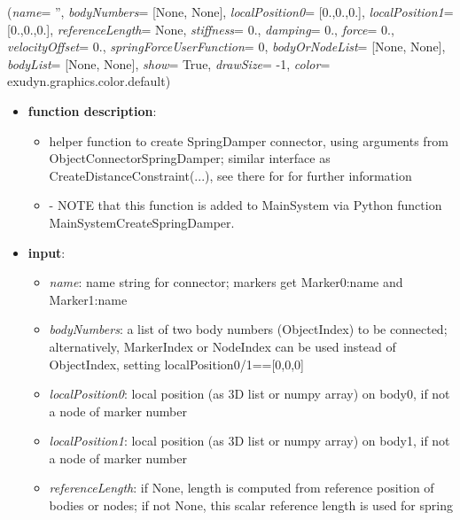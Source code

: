 %
\begin{flushleft}
\label{sec:mainsystemextensions:CreateSpringDamper}
({\it name}= '', {\it bodyNumbers}= [None, None], {\it localPosition0}= [0.,0.,0.], {\it localPosition1}= [0.,0.,0.], {\it referenceLength}= None, {\it stiffness}= 0., {\it damping}= 0., {\it force}= 0., {\it velocityOffset}= 0., {\it springForceUserFunction}= 0, {\it bodyOrNodeList}= [None, None], {\it bodyList}= [None, None], {\it show}= True, {\it drawSize}= -1, {\it color}= exudyn.graphics.color.default)
\end{flushleft}
\setlength{\itemindent}{0.7cm}
\begin{itemize}[leftmargin=0.7cm]
\item[--]
{\bf function description}: \vspace{-6pt}
\begin{itemize}[leftmargin=1.2cm]
\setlength{\itemindent}{-0.7cm}
\item[]helper function to create SpringDamper connector, using arguments from ObjectConnectorSpringDamper; similar interface as CreateDistanceConstraint(...), see there for for further information
\item[]- NOTE that this function is added to MainSystem via Python function MainSystemCreateSpringDamper.
\end{itemize}
\item[--]
{\bf input}: \vspace{-6pt}
\begin{itemize}[leftmargin=1.2cm]
\setlength{\itemindent}{-0.7cm}
\item[]{\it name}: name string for connector; markers get Marker0:name and Marker1:name
\item[]{\it bodyNumbers}: a list of two body numbers (ObjectIndex) to be connected; alternatively, MarkerIndex or NodeIndex can be used instead of ObjectIndex, setting localPosition0/1==[0,0,0]
\item[]{\it localPosition0}: local position (as 3D list or numpy array) on body0, if not a node of marker number
\item[]{\it localPosition1}: local position (as 3D list or numpy array) on body1, if not a node of marker number
\item[]{\it referenceLength}: if None, length is computed from reference position of bodies or nodes; if not None, this scalar reference length is used for spring

\end{itemize}
\end{itemize}
